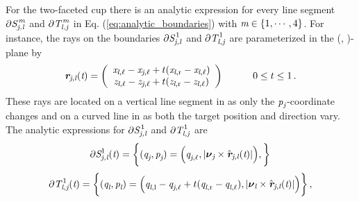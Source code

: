  For the two-faceted cup there is an analytic expression for every line segment $\partial\mbox{$\emph{S}_{\textit{\textit{j},\textit{l}}}^{\textit{\,m}}$}$ and
 $\partial\mbox{$\emph{T}_{\textit{\textit{l},\textit{j}}}^{\textit{\,m}}$}$ in Eq. (\ref{eq:analytic_boundaries}) with $\textit{m}\in\{1, \cdots, 4\}$.
 For instance, the rays on the boundaries $\partial\mbox{$\emph{S}_{\textit{\textit{j},\textit{l}}}^{\,1}$}$ and $\partial \mbox{$\emph{T}_{\textit{\textit{l},\textit{j}}}^{\,1}$}$
  are parameterized in the (, )-plane by
 \begin{equation}
\label{extremes_rays}
\textit{\textbf{r}}_{\textit{\textit{j}}, \textit{\textit{l}}}(\textit{t})=
\left( \begin{array}{cc}
\textit{x}_{\textit{\textit{l}}, \ell}-\textit{x}_{\textit{\textit{j}}, \ell}+t(\textit{x}_{\textit{\textit{l}}, \textrm{r}}-\textit{x}_{\textit{\textit{l}}, \ell}) \\
\textit{z}_{\textit{\textit{l}}, \ell}-\textit{z}_{\textit{\textit{j}}, \ell}+t(\textit{z}_{\textit{\textit{l}}, \textrm{r}}-\textit{z}_{\textit{\textit{l}},\ell})
\end{array} \right) \qquad \quad 0\leq t\leq 1\,.
\end{equation}
 These rays are located on a vertical line segment in  as only the $\mbox{\textit{p}}_{\textit{\textit{j}}}$-coordinate changes and on a curved line in 
  as both the target position and direction vary. The analytic expressions for $\partial \mbox{$\emph{S}_{\textit{\textit{j},\textit{l}}}^{\,1}$}$ and $\partial \mbox{$\emph{T}_{\textit{\textit{l},\textit{j}}}^{\,1}$}$ are
\begin{equation}
\label{S_boundary}
\partial \mbox{$\emph{S}_{\textit{\textit{j},\textit{l}}}^{1}$}(\textit{t})= \bigg\{ (\textit{q}_{\textit{\textit{j}}}, \textit{p}_{\textit{\textit{j}}}) = \Big(\textit{q}_{\textit{\textit{j}}, \ell},
|\boldsymbol{\nu}_{\textit{\textit{j}}}\times \hat{\textit{\textbf{r}}}_{\textit{\textit{j}}, \textit{\textit{l}}}(\textit{t})|
\Big), \bigg\}
\end{equation}
\begin{equation}
\label{T_boundary}
\partial\mbox{$\emph{T}_{\textit{\textit{l},\textit{j}}}^{\,1}$}(\textit{t})=\bigg\{(\textit{q}_{\textit{\textit{l}}}, \textit{p}_{\textit{\textit{l}}}) =
\Big(\textit{q}_{\textit{\textit{l}}, \textrm{l}}-\textit{q}_{\textit{\textit{j}}, \ell}+t(\textit{q}_{\textit{\textit{l}}, \textrm{r}}-\textit{q}_{\textit{\textit{l}},\ell}),
|\boldsymbol{\nu}_{\textit{\textit{l}}}\times \hat{\textit{\textbf{r}}}_{\textit{\textit{j}}, \textit{\textit{l}}}(\textit{t})|\Big) \bigg\}\,,
\end{equation}
